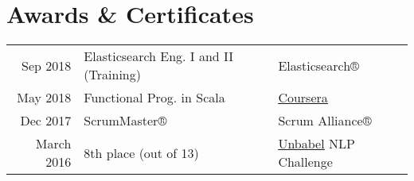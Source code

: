 \documentclass[letterpaper]{deedy-resume} %
\begin{document}
\begin{minipage}[t]{0.64\textwidth}
\vspace{\topsep}

\section{Awards \& Certificates} 
\begin{tabular}{rll}
Sep 2018   & Elasticsearch Eng. I and II (Training)              & Elasticsearch® \\
May 2018         & Functional Prog. in Scala              & \href{https://www.coursera.org/account/accomplishments/verify/N4KVKVTZBQD2}{\underline{Coursera}}          \\
Dec 2017         & ScrumMaster®                                 & Scrum Alliance®   \\             
March 2016		 & 8th place (out of 13)                        & \href{https://unbabel.com/}{\underline{Unbabel}} NLP Challenge \\

\end{tabular}


\end{minipage} %








\end{document}

